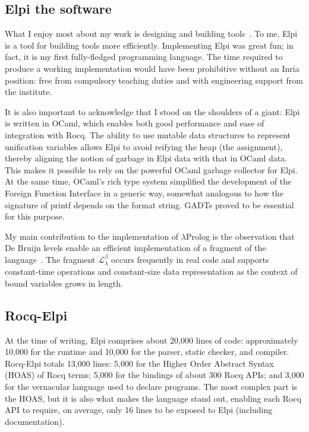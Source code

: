 \documentclass{these-ISSS}
\begin{document}
\subsection{Elpi the software}


What I enjoy most about my work is designing and building
tools~\cite{DBLP:journals/jar/AspertiCTZ07,gonthier:inria-00258384,Coq-refman}.
To me, Elpi is a tool for building tools more efficiently. Implementing Elpi
was great fun; in fact, it is my first fully-fledged programming language. The
time required to produce a working implementation would have been prohibitive
without an Inria position: free from compulsory teaching duties and with
engineering support from the institute. %

It is also important to acknowledge that I stood on the shoulders of a
giant: Elpi is written in OCaml, which enables both good performance and
ease of integration with Rocq. The ability to use mutable data structures to
represent unification variables allows Elpi to avoid reifying the heap (the
assignment), thereby aligning the notion of garbage in Elpi data with that in
OCaml data. This makes it possible to rely on the powerful OCaml garbage
collector for Elpi. At the same time, OCaml's rich type system simplified the
development of the Foreign Function Interface in a generic way, somewhat
analogous to how the signature of printf depends on the format string.
GADTs proved to be essential for this purpose.

My main contribution to the implementation of $\lambda$Prolog is the
observation that De Bruijn levels enable an efficient implementation of a
fragment of the language~\cite{dunchev15lpar}. The fragment
$\mathcal{L}_\lambda^{\beta}$ occurs frequently in real code and supports
constant-time operations and constant-size data representation as the context
of bound variables grows in length.

\subsection{Rocq-Elpi}


At the time of writing, Elpi comprises about 20,000 lines of code:
approximately 10,000 for the runtime and 10,000 for the parser, static checker,
and compiler. Rocq-Elpi totals 13,000 lines: 5,000 for the Higher Order
Abstract Syntax (HOAS) of Rocq terms; 5,000 for the bindings of
about 300 Rocq APIs; and 3,000 for the vernacular language used to declare
programs. The most complex part is the HOAS, but it is also what makes the
language stand out, enabling each Rocq API to require, on average, only 16
lines to be exposed to Elpi (including documentation).
\end{document}
